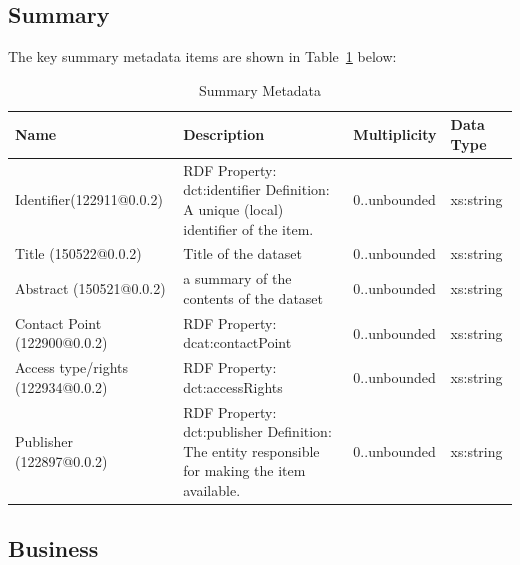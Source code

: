 \documentclass{article}
\begin{document}
\subsection{Summary}
The key summary metadata items are shown in Table~\ref{tab:summary} below:
\begin{table}[h]
	\begin{center}
		\caption{Summary Metadata}
		\label{tab:summary}
		\begin{tabular}{ p{3cm} | p{5cm} | p{2cm} | p{1cm}  } 
			\textbf{Name} &	\textbf{Description	}& \textbf{Multiplicity} &	\textbf{Data Type }\\
			\hline
			Identifier(122911@0.0.2)	& RDF Property:	dct:identifier
			Definition:	A unique  (local)  identifier of the item.
			&	0..unbounded &	xs:string\\
			\hline
			Title (150522@0.0.2)&	Title of the dataset &	0..unbounded &	xs:string
			\\
			\hline
			Abstract (150521@0.0.2)	& a summary of the contents of the dataset&	0..unbounded&	xs:string \\
			\hline
			Contact Point (122900@0.0.2) &	RDF Property:	dcat:contactPoint 
& 0..unbounded &	xs:string \\
			\hline
			Access type/rights (122934@0.0.2) &	RDF Property:	dct:accessRights
& 0..unbounded &	xs:string\\
			\hline
			Publisher (122897@0.0.2) &	RDF Property:	dct:publisher
			Definition:	The entity responsible for making the item available.
			& 0..unbounded &	xs:string

			\\
			
		\end{tabular}
	\end{center}
\end{table}
\FloatBarrier
\newpage
\subsection{Business}
\end{document}
